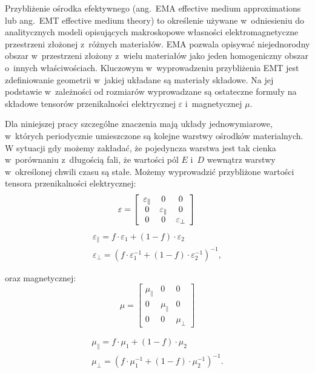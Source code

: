 \label{subart:effmedium}
Przybliżenie ośrodka efektywnego (ang.~EMA effective medium approximations lub ang.~EMT effective medium theory) to określenie używane w~odniesieniu do analitycznych modeli opisujących makroskopowe własności elektromagnetyczne przestrzeni złożonej z~różnych materiałów. EMA pozwala opisywać niejednorodny obszar w~przestrzeni złożony z~wielu materiałów jako jeden homogeniczny obszar o~innych właściwościach. Kluczowym w~wyprowadzeniu przybliżenia EMT jest zdefiniowanie geometrii w~jakiej układane są materiały składowe. Na jej podstawie w~zależności od rozmiarów wyprowadzane są ostateczne formuły na składowe tensorów przenikalności elektrycznej $\varepsilon$ i~magnetycznej $\mu$.

Dla niniejszej pracy szczególne znaczenia mają układy jednowymiarowe, w~których periodycznie umieszczone są kolejne warstwy ośrodków materialnych. W sytuacji gdy możemy zakładać, że pojedyncza warstwa jest tak cienka w~porównaniu z~długością fali, że wartości pól $E$ i~$D$ wewnątrz warstwy w~określonej chwili czasu są stałe. Możemy wyprowadzić przybliżone wartości tensora przenikalności elektrycznej:
\[ \varepsilon= \left[ \begin{array}{ccc}
	\varepsilon_{\parallel} & 0 & 0 \\
	0 & \varepsilon_{\parallel} & 0 \\
	0 & 0 &  \varepsilon_{\perp} \end{array} \right] 
\\
\]
\begin{equation}
	\begin{gathered}
		\varepsilon_{\parallel}=f\cdot{\varepsilon_1}+(1-f)\cdot \varepsilon_2 \\ 
		\varepsilon_{\perp}=\left(f\cdot{\varepsilon_1^{-1}}+(1-f)\cdot \varepsilon_2^{-1}\right)^{-1},
	\end{gathered}
\label{eq:effmedium}
\end{equation}


oraz magnetycznej:
\[ \mu= \left[ \begin{array}{ccc}
					\mu_{\parallel} & 0 & 0 \\
					0 & \mu_{\parallel} & 0 \\
					0 & 0 &  \mu_{\perp} \end{array} \right]
\]

\begin{equation}
	\begin{gathered}
		\mu_{\parallel}=f\cdot{\mu_1}+(1-f)\cdot \mu_2 \\
		\mu_{\perp}=\left(f\cdot{\mu_1^{-1}}+(1-f)\cdot \mu_2^{-1}\right)^{-1}.
	\end{gathered}
\label{eq:effmedium-mu}
\end{equation}

